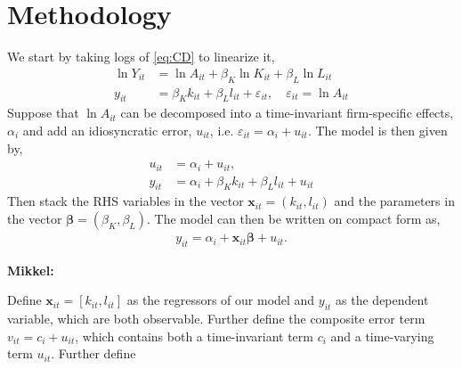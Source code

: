 \section{Methodology} \label{sec:methodology}

We start by taking logs of \eqref{eq:CD} to linearize it,
\begin{align*}
    \ln Y_{it} &= \ln A_{it} + \beta_K \ln K_{it} + \beta_L \ln L_{it} \\
    y_{it} &= \beta_K k_{it} + \beta_L l_{it} + \varepsilon_{it}, \quad \varepsilon_{it} = \ln A_{it}
\end{align*}
Suppose that $\ln A_{it}$ can be decomposed into a time-invariant firm-specific effects, $\alpha_i$ and add an idiosyncratic error, $u_{it}$, i.e. $\varepsilon_{it} = \alpha_i + u_{it}$. The model is then given by,
\begin{align*}
    u_{it} &= \alpha_i + u_{it}, \\
    y_{it} &= \alpha_i + \beta_K k_{it} + \beta_L l_{it} + u_{it}
\end{align*}
Then stack the RHS variables in the vector $\bm{x}_{it} = (k_{it}, l_{it})$ and the parameters in the vector $\bm{\beta} = (\beta_K, \beta_L)$. The model can then be written on compact form as,
\begin{align*}
    y_{it} = \alpha_i + \bm{x}_{it} \bm{\beta} + u_{it}.
\end{align*}

\textbf{Mikkel:}

Define $\pmb{x}_{it}=[k_{it}, l_{it}]$ as the regressors of our model and $y_{it}$ as the dependent variable, which are both observable. Further define the composite error term $v_{it}=c_i+u_{it}$, which contains both a time-invariant term $c_i$ and a time-varying term $u_{it}$. Further define 

